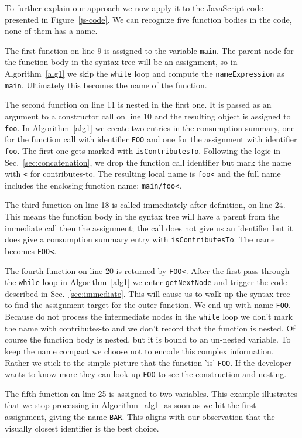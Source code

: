 \documentclass[10pt, preprint]{sigplanconf}
\begin{document}
To further explain our approach we now apply it to the JavaScript code presented in Figure~\ref{js-code}. We can recognize five function bodies in the code, none of them has a name. 

The first function on line 9 is assigned to the variable \verb|main|. The parent node for the function body in the syntax tree will be an assignment, so in Algorithm~\ref{alg1} we skip the \verb|while| loop and compute the \verb|nameExpression| as \verb|main|.  Ultimately this becomes the name of the function.

The second function on line 11 is nested in the first one.  It is passed as an argument to a constructor call on line 10 and the resulting object is assigned to \verb|foo|. In Algorithm~\ref{alg1} we create two entries in the consumption summary, one for the function call with identifier \verb|FOO| and one for the assignment with identifier \verb|foo|. The first one gets marked with \verb|isContributesTo|.  Following the logic in Sec.~\ref{sec:concatenation}, we drop the function call identifier but mark the name with \verb|<| for contributes-to. The resulting local name is \verb|foo<| and the full name includes the enclosing function name: \verb|main/foo<|.

The third function on line 18 is called immediately after definition, on line 24. This means the function body in the syntax tree will have a parent from the immediate call then the assignment; the call does not give us an identifier but it does give a consumption summary entry with \verb|isContributesTo|. The name becomes \verb|FOO<|.

The fourth function on line 20 is returned by \verb|FOO<|. After the first pass through the \verb|while| loop in Algorithm~\ref{alg1} we enter \verb|getNextNode| and trigger the code described in Sec.~\ref{sec:immediate}.  This will cause us to walk up the syntax tree to find the assignment target for the outer function. We end up with name \verb|FOO|. Because do not process the intermediate nodes in the \verb|while| loop we don't mark the name with contributes-to and we don't record that the function is nested. Of course the function body is nested, but it is bound to an un-nested variable. To keep the name compact we choose not to encode this complex information. Rather we stick to the simple picture that the function 'is' \verb|FOO|. If the developer wants to know more they can look up \verb|FOO| to see the construction and nesting.

The fifth function on line 25 is assigned to two variables. This example illustrates that we stop processing in Algorithm~\ref{alg1} as soon as we hit the first assignment, giving the name \verb|BAR|. This aligns with our observation that the visually closest identifier is the best choice.
\end{document}
